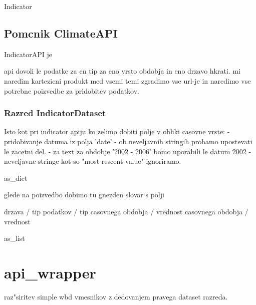 Indicator



% 
% 
% 
% 
% 
% 




\subsection{Pomcnik ClimateAPI}

IndicatorAPI je 


api dovoli le podatke za en tip za eno vrsto obdobja in eno drzavo hkrati.
mi naredim kartezicni produkt med vsemi temi zgradimo vse url-je in naredimo
vse potrebne poizvedbe za pridobitev podatkov.



\subsubsection{Razred IndicatorDataset}

Isto kot pri indicator apiju
ko zelimo dobiti polje v obliki casovne vrste:
 - pridobivanje datuma iz polja 'date'
   - ob neveljavnih stringih probamo upostevati le zacetni del.
     - za text za  obdobje  '2002 - 2006' bomo uporabili le datum 2002 
   - neveljavne stringe kot so "most rescent value" ignoriramo.




as\_dict 

glede na poizvedbo dobimo tu gnezden slovar s polji

drzava / tip podatkov / tip casovnega obdobja / vrednost casovnega obdobja / vrednost

as\_list

% 
% 



\section{api\_wrapper}



raz"siritev simple wbd vmesnikov z dedovanjem pravega dataset razreda.

